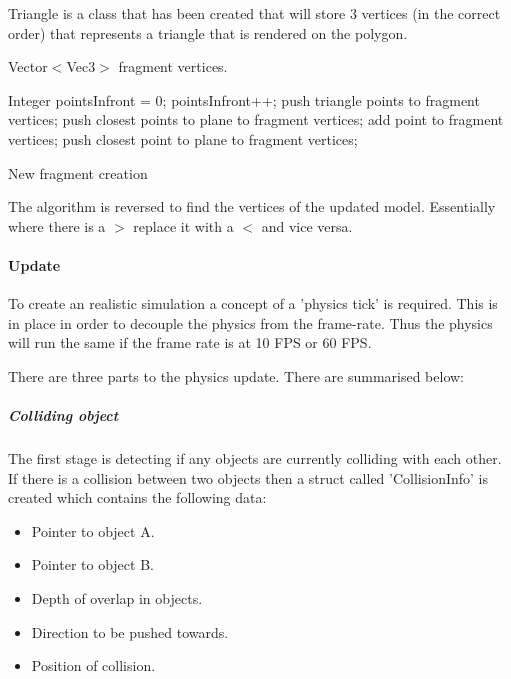 \documentclass[conference,backref=page]{acmsiggraph}
\begin{document}
Triangle is a class that has been created that will store 3 vertices (in the correct order) that represents a triangle that is rendered on the polygon.

\begin{algorithm}
Vector$<$Vec3$>$ fragment vertices.  \hfill

{
		Integer pointsInfront = 0; \hfill 
		{
			{
				pointsInfront++;
			}
		}
	{
		push triangle points to fragment vertices;
	}
	{
		push closest points to plane to fragment vertices;
	}
		{
			{
				add point to fragment vertices; 
			}	
			\Else
			{
				push closest point to plane to fragment vertices;
			}
		}
	}
 \caption{New fragment creation}
\end{algorithm}

The algorithm is reversed to find the vertices of the updated model. Essentially where there is a $>$ replace it with a $<$ and vice versa.






\paragraph{Update} \hfill

To create an realistic simulation a concept of a 'physics tick' is required. This is in place in order to decouple the physics from the frame-rate. Thus the physics will run the same if the frame rate is at 10 FPS or 60 FPS.  

There are three parts to the physics update. There are summarised below:

\subparagraph{Colliding object}
The first stage is detecting if any objects are currently colliding with each other.
If there is a collision between two objects then a struct called 'CollisionInfo' is created which contains the following data:

\begin{itemize}
\item{Pointer to object A.}
\item{Pointer to object B.}
\item{Depth of overlap in objects.}
\item{Direction to be pushed towards.}
\item{Position of collision.}
\end{itemize}
\end{document}
